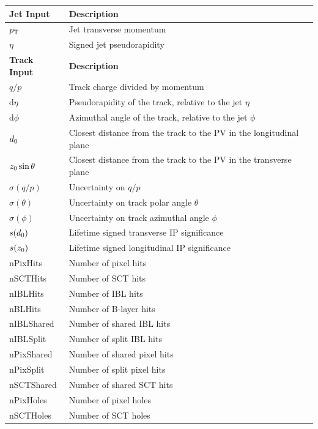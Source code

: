 \begin{table}[!htbp]
  \footnotesize\centering
  \setlength{\tabcolsep}{0.5em} %
  \begin{tabular}{ll}
    \toprule\hline 
    \textbf{Jet Input} & \textbf{Description} \\
    \hline
    $p_{\text{T}}$ & Jet transverse momentum \\
    $\eta$ & Signed jet pseudorapidity \\
    \toprule
    \textbf{Track Input} & \textbf{Description} \\
    \hline
    $q/p$ & Track charge divided by momentum \\
    $\mathrm{d}\eta$ & Pseudorapidity of the track, relative to the jet $\eta$ \\
    $\mathrm{d}\phi$  & Azimuthal angle of the track, relative to the jet $\phi$ \\
    $d_{0}$  & Closest distance from the track to the PV in the longitudinal plane \\
    $z_{0}\sin\theta$  & Closest distance from the track to the PV in the transverse plane \\
    $\sigma(q/p)$ & Uncertainty on $q/p$ \\
    $\sigma(\theta)$ & Uncertainty on track polar angle $\theta$ \\
    $\sigma(\phi)$  & Uncertainty on track azimuthal angle $\phi$ \\
    $s(d_0)$  & Lifetime signed transverse IP significance \\
    $s(z_0)$  & Lifetime signed longitudinal IP significance \\
    nPixHits   & Number of pixel hits \\
    nSCTHits   & Number of SCT hits \\
    nIBLHits   & Number of IBL hits \\
    nBLHits    & Number of B-layer hits \\
    nIBLShared & Number of shared IBL hits \\
    nIBLSplit  & Number of split IBL hits \\
    nPixShared & Number of shared pixel hits \\
    nPixSplit  & Number of split pixel hits \\
    nSCTShared & Number of shared SCT hits \\
    nPixHoles  & Number of pixel holes \\
    nSCTHoles  & Number of SCT holes \\

\end{tabular}
\end{table}

